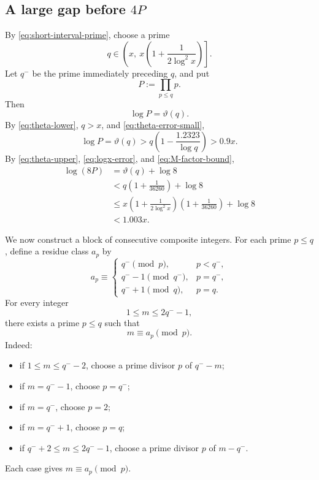 \documentclass[11pt]{article}
\numberwithin{equation}{section}
\theoremstyle{plain}
\theoremstyle{definition}
\theoremstyle{remark}
\begin{document}
\subsection{A large gap before \texorpdfstring{\(4P\)}{4P}}

By \eqref{eq:short-interval-prime}, choose a prime
\[
        q\in\left(x,\ x\left(1+\frac1{2\log^2x}\right)\right].
\]
Let \(q^-\) be the prime immediately preceding \(q\), and put
\[
        P:=\prod_{p\le q}p.
\]
Then
\[
        \log P=\vartheta(q).
\]
By \eqref{eq:theta-lower}, \(q>x\), and \eqref{eq:theta-error-small},
\begin{equation}\label{eq:logP-lower}
\log P
        =
        \vartheta(q)
        >
        q\left(1-\frac{1.2323}{\log q}\right)
        >
        0.9x.
\end{equation}
By \eqref{eq:theta-upper}, \eqref{eq:logx-error}, and \eqref{eq:M-factor-bound},
\begin{equation}\label{eq:log8P-upper}
\begin{aligned}
        \log(8P)
        &=
        \vartheta(q)+\log 8\\
        &<
        q\left(1+\frac1{36260}\right)+\log8\\
        &\le
        x\left(1+\frac1{2\log^2x}\right)
        \left(1+\frac1{36260}\right)+\log8\\
        &<1.003x.
\end{aligned}
\end{equation}

We now construct a block of consecutive composite integers.  For each prime \(p\le q\), define a residue class \(a_p\) by
\[
        a_p\equiv
        \begin{cases}
        q^- \pmod p,&p<q^-,\\
        q^- -1\pmod {q^-},&p=q^-,\\
        q^- +1\pmod q,&p=q.
        \end{cases}
\]
For every integer
\[
        1\le m\le2q^- -1,
\]
there exists a prime \(p\le q\) such that
\[
        m\equiv a_p\pmod p.
\]
Indeed:
\begin{itemize}
\item if \(1\le m\le q^- -2\), choose a prime divisor \(p\) of \(q^- -m\);
\item if \(m=q^- -1\), choose \(p=q^-\);
\item if \(m=q^-\), choose \(p=2\);
\item if \(m=q^-+1\), choose \(p=q\);
\item if \(q^-+2\le m\le2q^- -1\), choose a prime divisor \(p\) of \(m-q^-\).
\end{itemize}
Each case gives \(m\equiv a_p\pmod p\).
\end{document}
